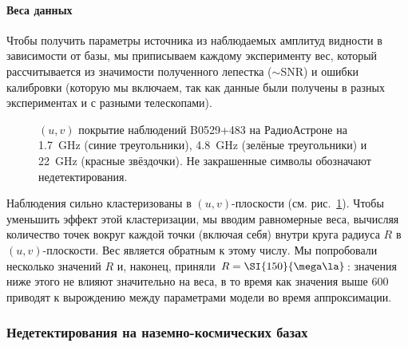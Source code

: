 \paragraph{Веса данных}

Чтобы получить параметры источника из наблюдаемых амплитуд видности в зависимости от базы, мы
приписываем каждому эксперименту вес, который рассчитывается из значимости полученного лепестка
($\sim$SNR) и ошибки калибровки (которую мы включаем, так как данные были получены в разных
экспериментах и с разными телескопами).

\begin{figure}[]
\caption{$(u, v)$ покрытие наблюдений B0529+483 на РадиоАстроне на \SI{1.7}{\GHz} (синие
треугольники), \SI{4.8}{\GHz} (зелёные треугольники) и \SI{22}{\GHz} (красные звёздочки).
Не закрашенные символы обозначают недетектирования.}
\label{fig:0529_uv}
\end{figure}

Наблюдения сильно кластеризованы в $(u, v)$-плоскости (см. рис.~\ref{fig:0529_uv}). Чтобы уменьшить
эффект этой кластеризации, мы вводим равномерные веса, вычисляя количество точек вокруг каждой точки
(включая себя) внутри круга радиуса $R$ в $(u, v)$-плоскости. Вес является обратным к этому числу.
Мы попробовали несколько значений $R$ и, наконец, приняли $R = \SI{150}{\mega\la}$: значения ниже
этого не влияют значительно на веса, в то время как значения выше \SI{600}{\mega\la} приводят к
вырождению между параметрами модели во время аппроксимации.


\subsubsection{Недетектирования на наземно-космических базах}

